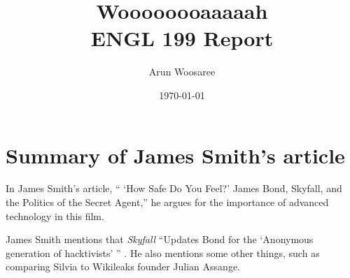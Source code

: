 \documentclass{IEEEtran}
\title{Woooooooaaaaah\\
\vspace{.25cm}\large ENGL 199 Report \vspace{-.5cm}}
\author{\LARGE Arun Woosaree}
\date{\today}
\begin{document}
  \maketitle %

  \section{Summary of James Smith's article }
  In James Smith's article, `` `How Safe Do You Feel?' James Bond,
  Skyfall, and the Politics of the Secret Agent,'' he argues for the
  importance of advanced technology in this film.

  James Smith mentions that \textit{Skyfall} ``Updates Bond for the `Anonymous generation of hacktivists' ''
  \cite{jamessmith}. He also mentions some other things, such as comparing
  Silvia to Wikileaks founder Julian Assange.
% 

\end{document}
